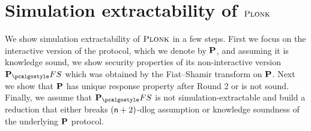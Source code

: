 \documentclass[runningheads,11pt]{llncs}
\theoremstyle{definition}
\begin{document}
\section{Simulation extractability of $\textsc{Plonk}$}
We show simulation extractability of $\textsc{Plonk}$ in a few steps. 
First we focus on the interactive version of the protocol, which we denote by $\mathbf{P}$, and assuming it is knowledge sound, we show security properties of its non-interactive version $\plonkprotfs$ which was obtained by the Fiat--Shamir transform on $\mathbf{P}$.
Next we show that $\mathbf{P}$ has unique response property after Round 2 or is not sound.
Finally, we assume that $\plonkprotfs$ is not simulation-extractable and build a reduction that either breaks $(\mathsf{n} + 2)$-dlog assumption or knowledge soundness of the underlying $\mathbf{P}$ protocol.
\end{document}
